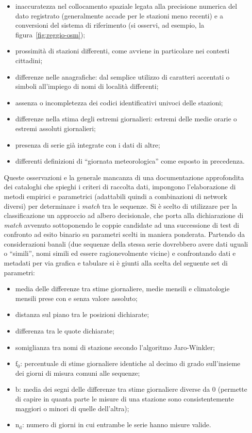 \begin{itemize}
  \item
    inaccuratezza nel collocamento spaziale legata alla precisione numerica del dato registrato (generalmente accade per le stazioni meno recenti) e a conversioni del sistema di riferimento (si osservi, ad esempio, la figura~\ref{fig:reggio-osm});
  \item
    prossimità di stazioni differenti, come avviene in particolare nei contesti cittadini;
  \item
    differenze nelle anagrafiche: dal semplice utilizzo di caratteri accentati o simboli all'impiego di nomi di località differenti;
  \item
    assenza o incompletezza dei codici identificativi univoci delle stazioni;
  \item
    differenze nella stima degli estremi giornalieri: estremi delle medie orarie o estremi assoluti giornalieri;
  \item
    presenza di serie già integrate con i dati di altre;
  \item
    differenti definizioni di ``giornata meteorologica'' come esposto in precedenza.
\end{itemize}

Queste osservazioni e la generale mancanza di una documentazione approfondita dei cataloghi che spieghi i criteri di raccolta dati, impongono l'elaborazione di metodi empirici e parametrici (adattabili quindi a combinazioni di network diversi) per determinare i \emph{match} tra le sequenze. Si è scelto di utilizzare per la classificazione un approccio ad albero decisionale, che porta alla dichiarazione di \emph{match} avvenuto sottoponendo le coppie candidate ad una successione di test di confronto ad esito binario su parametri scelti in maniera ponderata. Partendo da considerazioni banali (due sequenze della stessa serie dovrebbero avere dati uguali o ``simili'', nomi simili ed essere ragionevolmente vicine) e confrontando dati e metadati per via grafica e tabulare si è giunti alla scelta del seguente set di parametri:

\begin{itemize}
  \item
    media delle differenze tra stime giornaliere, medie mensili e climatologie mensili prese con e senza valore assoluto;
  \item
    distanza sul piano tra le posizioni dichiarate;
  \item
    differenza tra le quote dichiarate;
  \item
    somiglianza tra nomi di stazione secondo l'algoritmo Jaro-Winkler;
  \item
    \(\mathrm{f}_0\): percentuale di stime giornaliere identiche al decimo di grado sull'insieme dei giorni di misura comuni alle sequenze;
  \item
    \(\mathrm{b}\): media dei segni delle differenze tra stime giornaliere diverse da 0 (permette di capire in quanta parte le misure di una stazione sono consistentemente maggiori o minori di quelle dell'altra);
  \item
    \(\mathrm{n_d}\): numero di giorni in cui entrambe le serie hanno misure valide.
\end{itemize}


